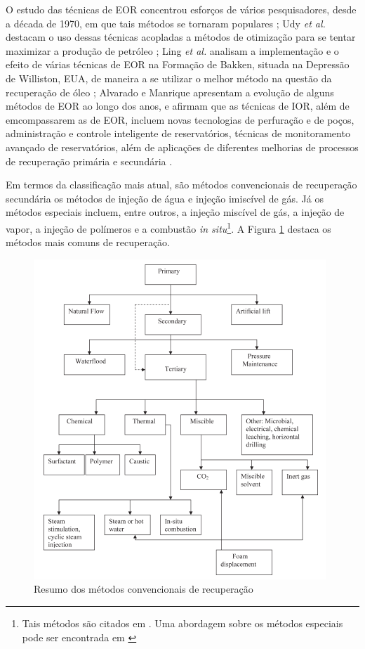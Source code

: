 O estudo das técnicas de EOR concentrou esforços de vários pesquisadores, desde a década de 1970, em que tais métodos se tornaram populares \cite{coats1982}; Udy \textit{et al.} destacam o uso dessas técnicas acopladas a métodos de otimização para se tentar maximizar a produção de petróleo \cite{udyEOR}; Ling \textit{et al.} analisam a implementação e o efeito de várias técnicas de EOR na Formação de Bakken, situada na Depressão de Williston, EUA, de maneira a se utilizar o melhor método na questão da recuperação de óleo \cite{ling2014}; Alvarado e Manrique apresentam a evolução de alguns métodos de EOR ao longo dos anos, e afirmam que as técnicas de IOR, além de emcompassarem as de EOR, incluem novas tecnologias de perfuração e de poços, administração e controle inteligente de reservatórios, técnicas de monitoramento avançado de reservatórios, além de aplicações de diferentes melhorias de processos de recuperação primária e secundária \cite{alvarado2010}.

Em termos da classifica\c{c}\~{a}o mais atual, s\~{a}o m\'{e}todos convencionais de recupera\c{c}\~{a}o secund\'{a}ria os m\'{e}todos de inje\c{c}\~{a}o de \'{a}gua e inje\c{c}\~{a}o imisc\'{i}vel de g\'{a}s. J\'{a} os m\'{e}todos especiais incluem, entre outros, a inje\c{c}\~{a}o misc\'{i}vel de g\'{a}s, a inje\c{c}\~{a}o de vapor, a inje\c{c}\~{a}o de pol\'{i}meros e a combust\~{a}o \textit{in situ}\footnote{Tais métodos são citados em \cite{oil1976}. Uma abordagem sobre os m\'{e}todos especiais pode ser encontrada em \cite[pp. 677-726]{engres}}. A Figura \ref{fig:recreview} destaca os métodos mais comuns de recuperação.

\begin{figure}[!ht]
	\centering
	\includegraphics[width=.6\textwidth]{figs/revisao/revisao_recmethods}
	\caption{Resumo dos métodos convencionais de recuperação \cite{adeniyi2008} \label{fig:recreview}}
\end{figure}

